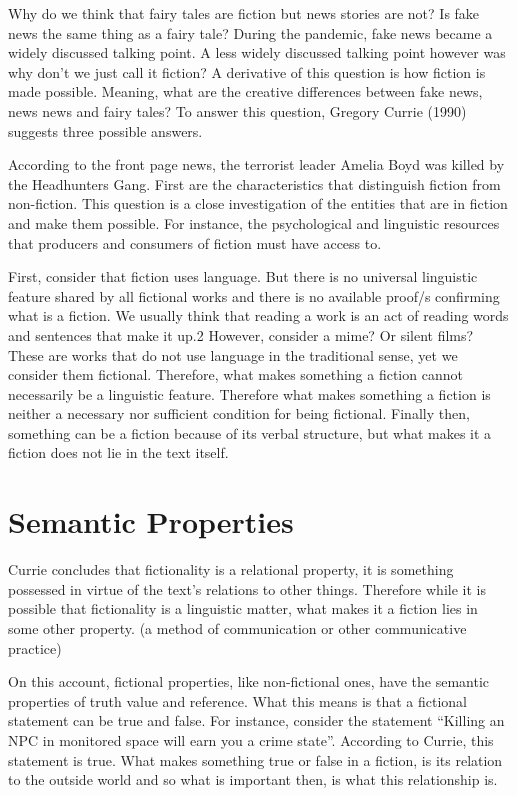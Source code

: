 \documentclass[
  letterpaper,
  DIV=11,
  numbers=noendperiod]{scrreprt}
\begin{document}
\begin{tcolorbox}[enhanced jigsaw, arc=.35mm, breakable, rightrule=.15mm, colback=white, colframe=quarto-callout-important-color-frame, bottomrule=.15mm, leftrule=.75mm, opacityback=0, toprule=.15mm, left=2mm]
\begin{tcolorbox}[enhanced jigsaw, arc=.35mm, breakable, rightrule=.15mm, colback=white, colframe=quarto-callout-tip-color-frame, bottomrule=.15mm, leftrule=.75mm, opacityback=0, toprule=.15mm, left=2mm]
Why do we think that fairy tales are fiction but news stories are not?
Is fake news the same thing as a fairy tale? During the pandemic, fake
news became a widely discussed talking point. A less widely discussed
talking point however was why don't we just call it fiction? A
derivative of this question is how fiction is made possible. Meaning,
what are the creative differences between fake news, news news and fairy
tales? To answer this question, Gregory Currie (1990) suggests three
possible answers.

According to the front page news, the terrorist leader Amelia Boyd was
killed by the Headhunters Gang. First are the characteristics that
distinguish fiction from non-fiction. This question is a close
investigation of the entities that are in fiction and make them
possible. For instance, the psychological and linguistic resources that
producers and consumers of fiction must have access to.

First, consider that fiction uses language. But there is no universal
linguistic feature shared by all fictional works and there is no
available proof/s confirming what is a fiction. We usually think that
reading a work is an act of reading words and sentences that make it
up.2 However, consider a mime? Or silent films? These are works that do
not use language in the traditional sense, yet we consider them
fictional. Therefore, what makes something a fiction cannot necessarily
be a linguistic feature. Therefore what makes something a fiction is
neither a necessary nor sufficient condition for being fictional.
Finally then, something can be a fiction because of its verbal
structure, but what makes it a fiction does not lie in the text itself.

\section{Semantic Properties}\label{semantic-properties}

Currie concludes that fictionality is a relational property, it is
something possessed in virtue of the text's relations to other things.
Therefore while it is possible that fictionality is a linguistic matter,
what makes it a fiction lies in some other property. (a method of
communication or other communicative practice)

On this account, fictional properties, like non-fictional ones, have the
semantic properties of truth value and reference. What this means is
that a fictional statement can be true and false. For instance, consider
the statement ``Killing an NPC in monitored space will earn you a crime
state''. According to Currie, this statement is true. What makes
something true or false in a fiction, is its relation to the outside
world and so what is important then, is what this relationship is.


\end{tcolorbox}
\end{tcolorbox}
\end{document}
